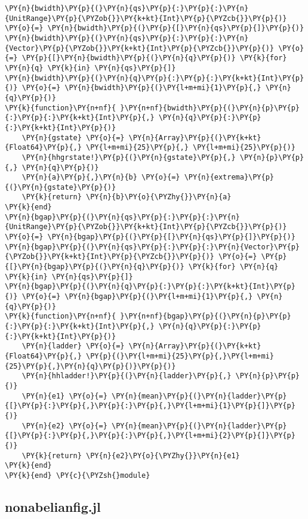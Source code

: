 \begin{Verbatim}[commandchars=\\\{\}]
\PY{n}{bwidth}\PY{p}{(}\PY{n}{qs}\PY{p}{:}\PY{p}{:}\PY{n}{UnitRange}\PY{p}{\PYZob{}}\PY{k+kt}{Int}\PY{p}{\PYZcb{}}\PY{p}{)} \PY{o}{=} \PY{n}{bwidth}\PY{p}{(}\PY{p}{[}\PY{n}{qs}\PY{p}{]}\PY{p}{)}
\PY{n}{bwidth}\PY{p}{(}\PY{n}{qs}\PY{p}{:}\PY{p}{:}\PY{n}{Vector}\PY{p}{\PYZob{}}\PY{k+kt}{Int}\PY{p}{\PYZcb{}}\PY{p}{)} \PY{o}{=} \PY{p}{[}\PY{n}{bwidth}\PY{p}{(}\PY{n}{q}\PY{p}{)} \PY{k}{for} \PY{n}{q} \PY{k}{in} \PY{n}{qs}\PY{p}{]}
\PY{n}{bwidth}\PY{p}{(}\PY{n}{q}\PY{p}{:}\PY{p}{:}\PY{k+kt}{Int}\PY{p}{)} \PY{o}{=} \PY{n}{bwidth}\PY{p}{(}\PY{l+m+mi}{1}\PY{p}{,} \PY{n}{q}\PY{p}{)}
\PY{k}{function}\PY{n+nf}{ }\PY{n+nf}{bwidth}\PY{p}{(}\PY{n}{p}\PY{p}{:}\PY{p}{:}\PY{k+kt}{Int}\PY{p}{,} \PY{n}{q}\PY{p}{:}\PY{p}{:}\PY{k+kt}{Int}\PY{p}{)}
    \PY{n}{gstate} \PY{o}{=} \PY{n}{Array}\PY{p}{(}\PY{k+kt}{Float64}\PY{p}{,} \PY{l+m+mi}{25}\PY{p}{,} \PY{l+m+mi}{25}\PY{p}{)}
    \PY{n}{hhgrstate!}\PY{p}{(}\PY{n}{gstate}\PY{p}{,} \PY{n}{p}\PY{p}{,} \PY{n}{q}\PY{p}{)}
    \PY{n}{a}\PY{p}{,}\PY{n}{b} \PY{o}{=} \PY{n}{extrema}\PY{p}{(}\PY{n}{gstate}\PY{p}{)}
    \PY{k}{return} \PY{n}{b}\PY{o}{\PYZhy{}}\PY{n}{a}
\PY{k}{end}
\PY{n}{bgap}\PY{p}{(}\PY{n}{qs}\PY{p}{:}\PY{p}{:}\PY{n}{UnitRange}\PY{p}{\PYZob{}}\PY{k+kt}{Int}\PY{p}{\PYZcb{}}\PY{p}{)} \PY{o}{=} \PY{n}{bgap}\PY{p}{(}\PY{p}{[}\PY{n}{qs}\PY{p}{]}\PY{p}{)}
\PY{n}{bgap}\PY{p}{(}\PY{n}{qs}\PY{p}{:}\PY{p}{:}\PY{n}{Vector}\PY{p}{\PYZob{}}\PY{k+kt}{Int}\PY{p}{\PYZcb{}}\PY{p}{)} \PY{o}{=} \PY{p}{[}\PY{n}{bgap}\PY{p}{(}\PY{n}{q}\PY{p}{)} \PY{k}{for} \PY{n}{q} \PY{k}{in} \PY{n}{qs}\PY{p}{]}
\PY{n}{bgap}\PY{p}{(}\PY{n}{q}\PY{p}{:}\PY{p}{:}\PY{k+kt}{Int}\PY{p}{)} \PY{o}{=} \PY{n}{bgap}\PY{p}{(}\PY{l+m+mi}{1}\PY{p}{,} \PY{n}{q}\PY{p}{)}
\PY{k}{function}\PY{n+nf}{ }\PY{n+nf}{bgap}\PY{p}{(}\PY{n}{p}\PY{p}{:}\PY{p}{:}\PY{k+kt}{Int}\PY{p}{,} \PY{n}{q}\PY{p}{:}\PY{p}{:}\PY{k+kt}{Int}\PY{p}{)}
    \PY{n}{ladder} \PY{o}{=} \PY{n}{Array}\PY{p}{(}\PY{k+kt}{Float64}\PY{p}{,} \PY{p}{(}\PY{l+m+mi}{25}\PY{p}{,}\PY{l+m+mi}{25}\PY{p}{,}\PY{n}{q}\PY{p}{)}\PY{p}{)}
    \PY{n}{hhladder!}\PY{p}{(}\PY{n}{ladder}\PY{p}{,} \PY{n}{p}\PY{p}{)}
    \PY{n}{e1} \PY{o}{=} \PY{n}{mean}\PY{p}{(}\PY{n}{ladder}\PY{p}{[}\PY{p}{:}\PY{p}{,}\PY{p}{:}\PY{p}{,}\PY{l+m+mi}{1}\PY{p}{]}\PY{p}{)}
    \PY{n}{e2} \PY{o}{=} \PY{n}{mean}\PY{p}{(}\PY{n}{ladder}\PY{p}{[}\PY{p}{:}\PY{p}{,}\PY{p}{:}\PY{p}{,}\PY{l+m+mi}{2}\PY{p}{]}\PY{p}{)}
    \PY{k}{return} \PY{n}{e2}\PY{o}{\PYZhy{}}\PY{n}{e1}
\PY{k}{end}
\PY{k}{end} \PY{c}{\PYZsh{}module}
\end{Verbatim}


\subsection{nonabelian\textunderscore fig.jl}\label{subsec:nonabelian}

